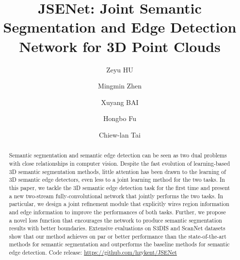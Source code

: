 \documentclass[runningheads]{llncs}
\begin{document}
\pagestyle{headings}
\mainmatter
\def\ECCVSubNumber{3411}  

\title{{JSENet: Joint Semantic Segmentation and Edge Detection Network for 3D Point Clouds}
} 

\begin{comment}
\titlerunning{ECCV-20 submission ID \ECCVSubNumber} 
\authorrunning{ECCV-20 submission ID \ECCVSubNumber} 
\author{Anonymous ECCV submission}
\institute{Paper ID \ECCVSubNumber}
\end{comment}


\author{Zeyu HU \and
Mingmin Zhen \and
Xuyang BAI \and
Hongbo Fu \and 
Chiew-lan Tai
}
\maketitle

\begin{abstract}
Semantic segmentation and semantic edge detection can be seen as two dual problems with close relationships in computer vision. Despite the fast evolution of learning-based 3D semantic segmentation methods, little attention has been drawn to the learning of 3D semantic edge detectors, even less to a joint learning method for the two tasks. In this paper, we tackle the 3D semantic edge detection task for the first time and present a new two-stream fully-convolutional network that jointly performs the two tasks. In particular, we design a joint refinement module that explicitly wires region information and edge information to improve the performances of both tasks. Further, we propose a novel loss function that encourages the network to produce semantic segmentation results with better boundaries. Extensive evaluations on S3DIS and ScanNet datasets show that our method achieves on par or better performance than the state-of-the-art methods for semantic segmentation and outperforms the baseline methods for semantic edge detection. Code release: \url{https://github.com/hzykent/JSENet}

\end{abstract}
\end{document}
